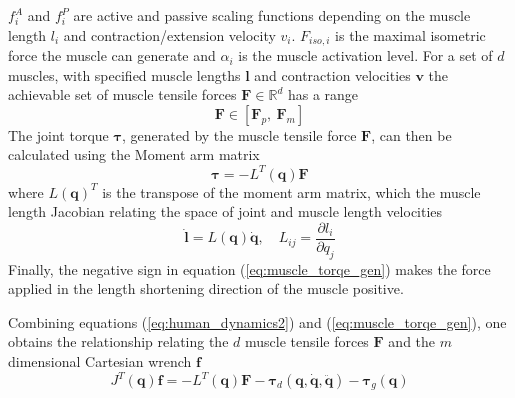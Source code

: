 $f^A_{i}$ and $f^P_{i}$ are active and passive scaling functions depending on the muscle length $l_i$ and contraction/extension velocity $v_i$. $F_{iso,i}$ is the maximal isometric force the muscle can generate and $\alpha_i$ is the muscle activation level. For a set of $d$ muscles, with specified muscle lengths $\bm{l}$ and contraction velocities $\bm{v}$ the achievable set of muscle tensile forces $\bm{F} \in\mathbb{R}^d$ has a range
\begin{equation}
    \bm{F} \in \left[ \bm{F}_{p}, ~ \bm{F}_m\right]
    \label{eq:muslce_initial_range}
\end{equation}
The joint torque $\bm{\tau}$, generated by the muscle tensile force $\bm{F}$, can then be calculated using the Moment arm matrix \cite{pandy1994}   
\begin{equation}
    \bm{\tau} = -L^{T}(\bm{q})\bm{F} 
    \label{eq:muscle_torqe_gen}
\end{equation}
where $L(\bm{q})^T$ is the transpose of the moment arm matrix, which  the muscle length Jacobian relating the space of joint and muscle length velocities  
\begin{equation}
    \dot{\bm{l}} = L(\bm{q}) \dot{\bm{q}},\quad L_{ij}=\dfrac{\partial l_i}{\partial q_j}
\end{equation}
Finally, the negative sign in equation (\ref{eq:muscle_torqe_gen}) makes the force applied in the length shortening direction of the muscle positive. 

Combining equations (\ref{eq:human_dynamics2}) and (\ref{eq:muscle_torqe_gen}), one obtains the relationship relating the $d$ muscle tensile forces $\bm{F}$ and  the $m$ dimensional Cartesian wrench $\bm{f}$
\begin{equation}
    J^{T}(\bm{q})\bm{f} = -L^{T}(\bm{q})\bm{F} - \bm{\tau}_d(\bm{q},\dot{\bm{q}},\ddot{\bm{q}})- \bm{\tau}_g(\bm{q})
\end{equation}

